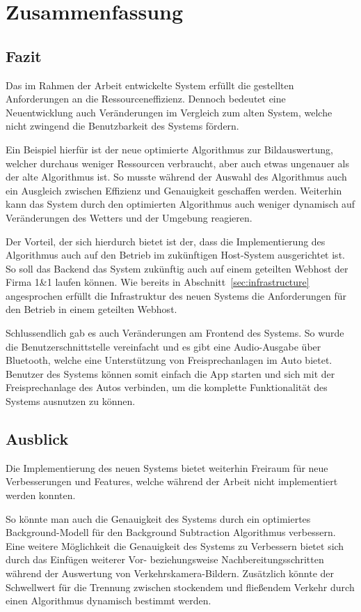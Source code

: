 \chapter{Zusammenfassung}

\section{Fazit}
Das im Rahmen der Arbeit entwickelte System erfüllt die gestellten Anforderungen an die Ressourceneffizienz.
Dennoch bedeutet eine Neuentwicklung auch Veränderungen im Vergleich zum alten System, welche nicht zwingend die Benutzbarkeit des Systems fördern.

Ein Beispiel hierfür ist der neue optimierte Algorithmus zur Bildauswertung, welcher durchaus weniger Ressourcen verbraucht, aber auch etwas ungenauer als der alte Algorithmus ist.
So musste während der Auswahl des Algorithmus auch ein Ausgleich zwischen Effizienz und Genauigkeit geschaffen werden.
Weiterhin kann das System durch den optimierten Algorithmus auch weniger dynamisch auf Veränderungen des Wetters und der Umgebung reagieren.

Der Vorteil, der sich hierdurch bietet ist der, dass die Implementierung des Algorithmus auch auf den Betrieb im zukünftigen Host-System ausgerichtet ist.
So soll das Backend das System zukünftig auch auf einem geteilten Webhost der Firma 1\&1 laufen können.
Wie bereits in Abschnitt~\ref{sec:infrastructure} angesprochen erfüllt die Infrastruktur des neuen Systems die Anforderungen für den Betrieb in einem geteilten Webhost.

Schlussendlich gab es auch Veränderungen am Frontend des Systems.
So wurde die Benutzerschnittstelle vereinfacht und es gibt eine Audio-Ausgabe über Bluetooth, welche eine Unterstützung von Freisprechanlagen im Auto bietet.
Benutzer des Systems können somit einfach die App starten und sich mit der Freisprechanlage des Autos verbinden, um die komplette Funktionalität des Systems ausnutzen zu können.
\newpage

\section{Ausblick}
Die Implementierung des neuen Systems bietet weiterhin Freiraum für neue Verbesserungen und Features, welche während der Arbeit nicht implementiert werden konnten.

So könnte man auch die Genauigkeit des Systems durch ein optimiertes Background-Modell für den Background Subtraction Algorithmus verbessern.
Eine weitere Möglichkeit die Genauigkeit des Systems zu Verbessern bietet sich durch das Einfügen weiterer Vor- beziehungsweise Nachbereitungsschritten während der Auswertung von Verkehrskamera-Bildern.
Zusätzlich könnte der Schwellwert für die Trennung zwischen stockendem und fließendem Verkehr durch einen Algorithmus dynamisch bestimmt werden.

